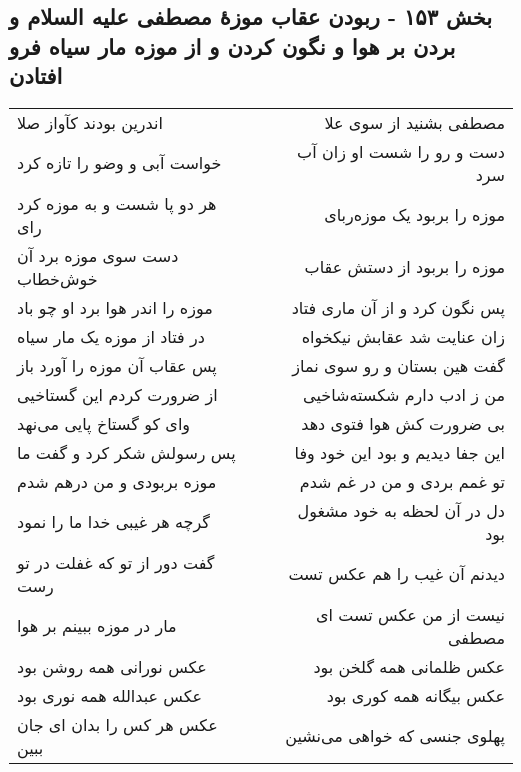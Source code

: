 \begin{center}
\section*{بخش ۱۵۳ - ربودن عقاب موزهٔ مصطفی علیه السلام و بردن بر هوا و نگون کردن و از موزه مار سیاه فرو افتادن}
\label{sec:sh153}
\begin{longtable}{l p{0.5cm} r}
اندرین بودند کآواز صلا
&&
مصطفی بشنید از سوی علا
\\
خواست آبی و وضو را تازه کرد
&&
دست و رو را شست او زان آب سرد
\\
هر دو پا شست و به موزه کرد رای
&&
موزه را بربود یک موزه‌ربای
\\
دست سوی موزه برد آن خوش‌خطاب
&&
موزه را بربود از دستش عقاب
\\
موزه را اندر هوا برد او چو باد
&&
پس نگون کرد و از آن ماری فتاد
\\
در فتاد از موزه یک مار سیاه
&&
زان عنایت شد عقابش نیکخواه
\\
پس عقاب آن موزه را آورد باز
&&
گفت هین بستان و رو سوی نماز
\\
از ضرورت کردم این گستاخیی
&&
من ز ادب دارم شکسته‌شاخیی
\\
وای کو گستاخ پایی می‌نهد
&&
بی ضرورت کش هوا فتوی دهد
\\
پس رسولش شکر کرد و گفت ما
&&
این جفا دیدیم و بود این خود وفا
\\
موزه بربودی و من درهم شدم
&&
تو غمم بردی و من در غم شدم
\\
گرچه هر غیبی خدا ما را نمود
&&
دل در آن لحظه به خود مشغول بود
\\
گفت دور از تو که غفلت در تو رست
&&
دیدنم آن غیب را هم عکس تست
\\
مار در موزه ببینم بر هوا
&&
نیست از من عکس تست ای مصطفی
\\
عکس نورانی همه روشن بود
&&
عکس ظلمانی همه گلخن بود
\\
عکس عبدالله همه نوری بود
&&
عکس بیگانه همه کوری بود
\\
عکس هر کس را بدان ای جان ببین
&&
پهلوی جنسی که خواهی می‌نشین
\\
\end{longtable}
\end{center}
